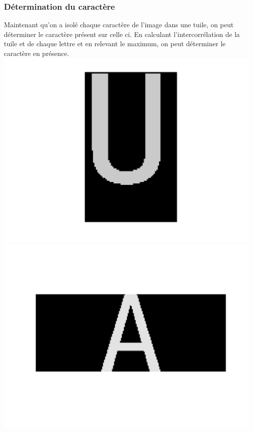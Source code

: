 \documentclass[a4paper,12pt,titlepage]{report}
\begin{document}
	\subsubsection{Détermination du caractère}
	Maintenant qu'on a isolé chaque caractère de l'image dans une tuile, on peut déterminer le caractère présent sur celle ci. En calculant l'intercorrélation de la tuile et de chaque lettre et en relevant le maximum, on peut déterminer le caractère en présence.\\
	\includegraphics[scale=0.25]{../illus/tuile.png}
	\includegraphics[scale=0.25]{../illus/2ech.png}
\end{document}
